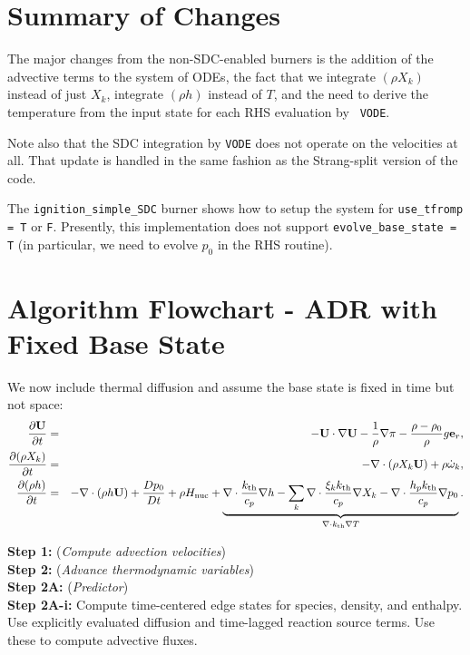 \section{Summary of Changes}
The major changes from the non-SDC-enabled burners is the addition of
the advective terms to the system of ODEs, the fact that we integrate
$(\rho X_k)$ instead of just $X_k$, integrate $(\rho h)$ instead
of $T$, and the need to derive the
temperature from the input state for each RHS evaluation by {\tt
  VODE}.

Note also that the SDC integration by {\tt VODE} does not operate on 
the velocities at all.  That update is handled in the same fashion 
as the Strang-split version of the code.

The {\tt ignition\_simple\_SDC} burner shows how to setup the system
for {\tt use\_tfromp = T} or {\tt F}.  Presently, this implementation
does not support {\tt evolve\_base\_state = T} (in particular, we 
need to evolve $p_0$ in the RHS routine).

\section{Algorithm Flowchart - ADR with Fixed Base State}
We now include thermal diffusion and assume the base state is fixed in time but not space:
\begin{eqnarray}
\frac{\partial{\bf U}}{\partial t} &=& 
    -{\bf U}\cdot\nabla{\bf U}  - \frac{1}{\rho}\nabla\pi 
    - \frac{\rho-\rho_0}{\rho} g{\bf e}_r,\\
\frac{\partial(\rho X_k)}{\partial t} &=& 
    -\nabla\cdot(\rho X_k{\bf U}) + \rho\dot{\omega}_k,\\
\frac{\partial(\rho h)}{\partial t} &=&
    -\nabla\cdot(\rho h{\bf U}) + \frac{Dp_0}{Dt} 
    + \rho{H_{\rm nuc}}
    + \underbrace{\nabla\cdot\frac{k_{\rm th}}{c_p}\nabla h - \sum_k\nabla\cdot\frac{\xi_k k_{\rm th}}{c_p}\nabla X_k - \nabla\cdot\frac{h_p k_{\rm th}}{c_p}\nabla p_0}_{\nabla\cdot k_{\rm th}\nabla T}.
\end{eqnarray}

{\bf Step 1:} ({\it Compute advection velocities})\\


{\bf Step 2:} ({\it Advance thermodynamic variables})\\

{\bf Step 2A:} ({\it Predictor})\\

{\bf Step 2A-i:} Compute time-centered edge states for species, density, and enthalpy.  Use explicitly evaluated diffusion and time-lagged reaction source terms.  Use these to compute advective fluxes.\\

